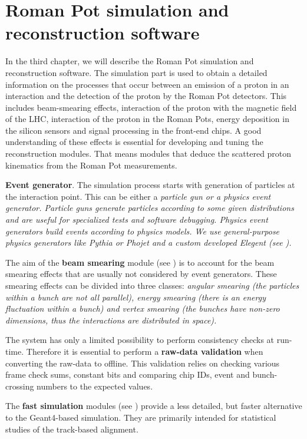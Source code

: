 \chapter[sr]{Roman Pot simulation and reconstruction software}


In the third chapter, we will describe the Roman Pot simulation and reconstruction software. The simulation part is used to obtain a detailed information on the processes that occur between an emission of a proton in an interaction and the detection of the proton by the Roman Pot detectors. This includes beam-smearing effects, interaction of the proton with the magnetic field of the LHC, interaction of the proton in the Roman Pots, energy deposition in the silicon sensors and signal processing in the front-end chips. A good understanding of these effects is essential for developing and tuning the reconstruction modules. That means modules that deduce the scattered proton kinematics from the Roman Pot measurements.

\> {\bf Event generator}.
The simulation process starts with generation of particles at the interaction point. This can be either a \em{particle gun} or a \em{physics event generator}. Particle guns generate particles according to some given distributions and are useful for specialized tests and software debugging. Physics event generators build events according to physics models. We use general-purpose physics generators like Pythia  or Phojet  and a custom developed Elegent (see ).

\> The aim of the {\bf beam smearing} module (see ) is to account for the beam smearing effects that are usually not considered by event generators. These smearing effects can be divided into three classes: \em{angular smearing} (the particles within a bunch are not all parallel), \em{energy smearing} (there is an energy fluctuation within a bunch) and \em{vertex smearing} (the bunches have non-zero dimensions, thus the interactions are distributed in space). 

\> The  system has only a limited possibility to perform consistency checks at run-time. Therefore it is essential to perform a {\bf raw-data validation} when converting the raw-data to  offline. This validation relies on checking various frame check sums, constant bits and comparing chip IDs, event and bunch-crossing numbers to the expected values.

\> The {\bf fast simulation} modules (see ) provide a less detailed, but faster alternative to the Geant4-based simulation. They are primarily intended for statistical studies of the track-based alignment.


